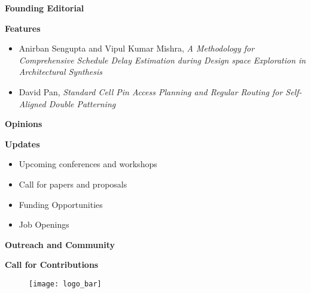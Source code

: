 {
\setlength{\parskip}{.2in}

\textbf{Founding Editorial}

\textbf{Features}
\vspace{-.2in}
\begin{itemize}
    \item Anirban Sengupta and Vipul Kumar Mishra,
    \textit{A Methodology for Comprehensive Schedule Delay Estimation during Design space Exploration in Architectural Synthesis}
    \item David Pan,
    \textit{Standard Cell Pin Access Planning and Regular Routing for Self-Aligned Double Patterning}
\end{itemize}

\textbf{Opinions}

\textbf{Updates}
\vspace{-.2in}
\begin{itemize}
    \item Upcoming conferences and workshops
    \item Call for papers and proposals
    \item Funding Opportunities
    \item Job Openings
\end{itemize}

\textbf{Outreach and Community}

\textbf{Call for Contributions}

}


\begin{figure}[b!]
  \centering
  \texttt{[image: logo\_bar]}
  \caption*{}
\end{figure}


